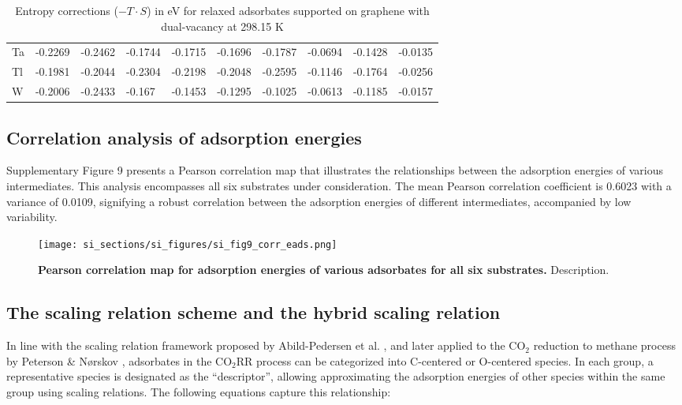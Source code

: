 \begin{table}[h]
{\begin{tabular}{*{10}{l}}
      Ta & -0.2269 & -0.2462 & -0.1744 & -0.1715 & -0.1696 & -0.1787 & -0.0694 & -0.1428 & -0.0135 \\
      Tl & -0.1981 & -0.2044 & -0.2304 & -0.2198 & -0.2048 & -0.2595 & -0.1146 & -0.1764 & -0.0256 \\
      W  & -0.2006 & -0.2433 & -0.167  & -0.1453 & -0.1295 & -0.1025 & -0.0613 & -0.1185 & -0.0157 \\
      \hline
  \end{tabular}
  }
  \caption{Entropy corrections ($-T \cdot S$) in eV for relaxed adsorbates supported on graphene with dual-vacancy at 298.15 K}
  \label{si_table12}
\end{table}


\subsection{Correlation analysis of adsorption energies}


Supplementary Figure 9 presents a Pearson correlation map that illustrates the relationships between the adsorption energies of various intermediates. This analysis encompasses all six substrates under consideration. The mean Pearson correlation coefficient is 0.6023 with a variance of 0.0109, signifying a robust correlation between the adsorption energies of different intermediates, accompanied by low variability.

\begin{figure}
  \centering
  \texttt{[image: si\_sections/si\_figures/si\_fig9\_corr\_eads.png]}
  \caption{\textbf{Pearson correlation map for adsorption energies of various adsorbates for all six substrates.}
  Description.}
  \label{si_fig9:corr_eads}
\end{figure}


\subsection{The scaling relation scheme and the hybrid scaling relation}


In line with the scaling relation framework proposed by Abild-Pedersen et al. \cite{abild2007scaling},
and later applied to the CO$_2$ reduction to methane process by Peterson \& Nørskov \cite{peterson2012activity},
adsorbates in the CO$_2$RR process can be categorized into C-centered or O-centered species.
In each group, a representative species is designated as the “descriptor”, allowing approximating the adsorption energies of other species within the same group using scaling relations.
The following equations capture this relationship:

